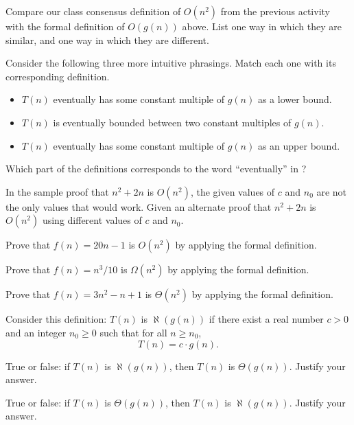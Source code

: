 \documentclass{tufte-handout}
\begin{document}
\begin{questions}
\item Compare our class consensus definition of $O(n^2)$ from the
  previous activity with the formal definition of $O(g(n))$ above.
  List one way in which they are similar, and one way in which they
  are different. \vspace{0.5in}
\item \label{q:phrasing} Consider the following three more intuitive
  phrasings.  Match each one with its corresponding definition.
    \begin{itemize}
    \item $T(n)$ eventually has some constant multiple of $g(n)$ as a
      lower bound.
    \item $T(n)$ is eventually bounded between two constant multiples
      of $g(n)$.
    \item $T(n)$ eventually has some constant multiple of $g(n)$ as an
      upper bound.
    \end{itemize}

  \item Which part of the definitions corresponds to the word
    ``eventually'' in ?

  \item \label{q:alt-proof} In the sample proof that $n^2 + 2n$ is $O(n^2)$, the given
    values of $c$ and $n_0$ are not the only values that would work.
    Given an alternate proof that $n^2 + 2n$ is $O(n^2)$ using
    different values of $c$ and $n_0$.
  \item Prove that $f(n) = 20n - 1$ is $O(n^2)$ by applying the formal
    definition.
    \vspace{0.5in}
  \item Prove that $f(n) = n^3/10$ is $\Omega(n^2)$ by applying the
    formal definition.
    \vspace{0.5in}
  \item \label{q:last-formal-proof} Prove that $f(n) = 3n^2 - n + 1$ is
    $\Theta(n^2)$ by applying the formal definition.  \vspace{0.5in}

  \item Consider this definition: $T(n)$ is $\aleph(g(n))$ if there
    exist a real number $c > 0$ and an integer $n_0 \geq 0$ such that
    for all $n \geq n_0$, \[ T(n) = c \cdot g(n). \]
    \begin{subquestions}
    \item True or false: if $T(n)$ is $\aleph(g(n))$, then $T(n)$ is
      $\Theta(g(n))$.  Justify your answer.
    \item True or false: if $T(n)$ is $\Theta(g(n))$, then $T(n)$ is
      $\aleph(g(n))$.  Justify your answer.
    \end{subquestions}
\end{questions}
\end{document}
